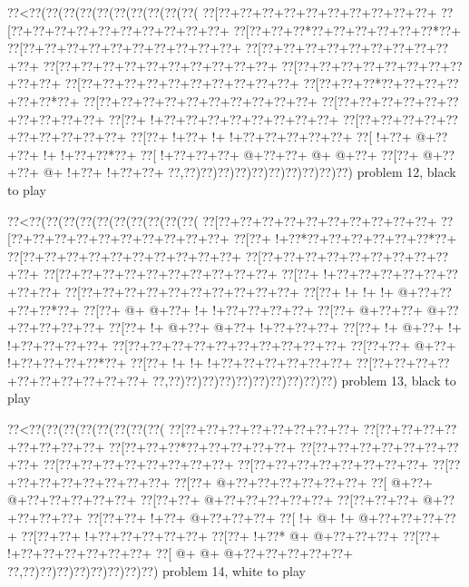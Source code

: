 \vbox{\vbox{\goo
\0??<\0??(\0??(\0??(\0??(\0??(\0??(\0??(\0??(\0??(\0??(
\0??[\0??+\0??+\0??+\0??+\0??+\0??+\0??+\0??+\0??+\0??+
\0??[\0??+\0??+\0??+\0??+\0??+\0??+\0??+\0??+\0??+\0??+
\0??[\0??+\0??+\0??*\0??+\0??+\0??+\0??+\0??+\0??*\0??+
\0??[\0??+\0??+\0??+\0??+\0??+\0??+\0??+\0??+\0??+\0??+
\0??[\0??+\0??+\0??+\0??+\0??+\0??+\0??+\0??+\0??+\0??+
\0??[\0??+\0??+\0??+\0??+\0??+\0??+\0??+\0??+\0??+\0??+
\0??[\0??+\0??+\0??+\0??+\0??+\0??+\0??+\0??+\0??+\0??+
\0??[\0??+\0??+\0??+\0??+\0??+\0??+\0??+\0??+\0??+\0??+
\0??[\0??+\0??+\0??*\0??+\0??+\0??+\0??+\0??+\0??*\0??+
\0??[\0??+\0??+\0??+\0??+\0??+\0??+\0??+\0??+\0??+\0??+
\0??[\0??+\0??+\0??+\0??+\0??+\0??+\0??+\0??+\0??+\0??+
\0??[\0??+\- !+\0??+\0??+\0??+\0??+\0??+\0??+\0??+\0??+
\0??[\0??+\0??+\0??+\0??+\0??+\0??+\0??+\0??+\0??+\0??+
\0??[\0??+\- !+\0??+\- !+\- !+\0??+\0??+\0??+\0??+\0??+
\0??[\- !+\0??+\- @+\0??+\0??+\- !+\- !+\0??+\0??*\0??+
\0??[\- !+\0??+\0??+\0??+\- @+\0??+\0??+\- @+\- @+\0??+
\0??[\0??+\- @+\0??+\0??+\- @+\- !+\0??+\- !+\0??+\0??+
\0??,\0??)\0??)\0??)\0??)\0??)\0??)\0??)\0??)\0??)\0??)
}
\hfil problem 12, black to play\hfil\break
}

\vbox{\vbox{\goo
\0??<\0??(\0??(\0??(\0??(\0??(\0??(\0??(\0??(\0??(\0??(
\0??[\0??+\0??+\0??+\0??+\0??+\0??+\0??+\0??+\0??+\0??+
\0??[\0??+\0??+\0??+\0??+\0??+\0??+\0??+\0??+\0??+\0??+
\0??[\0??+\- !+\0??*\0??+\0??+\0??+\0??+\0??+\0??*\0??+
\0??[\0??+\0??+\0??+\0??+\0??+\0??+\0??+\0??+\0??+\0??+
\0??[\0??+\0??+\0??+\0??+\0??+\0??+\0??+\0??+\0??+\0??+
\0??[\0??+\0??+\0??+\0??+\0??+\0??+\0??+\0??+\0??+\0??+
\0??[\0??+\- !+\0??+\0??+\0??+\0??+\0??+\0??+\0??+\0??+
\0??[\0??+\0??+\0??+\0??+\0??+\0??+\0??+\0??+\0??+\0??+
\0??[\0??+\- !+\- !+\- !+\- @+\0??+\0??+\0??+\0??*\0??+
\0??[\0??+\- @+\- @+\0??+\- !+\- !+\0??+\0??+\0??+\0??+
\0??[\0??+\- @+\0??+\0??+\- @+\0??+\0??+\0??+\0??+\0??+
\0??[\0??+\- !+\- @+\0??+\- @+\0??+\- !+\0??+\0??+\0??+
\0??[\0??+\- !+\- @+\0??+\- !+\- !+\0??+\0??+\0??+\0??+
\0??[\0??+\0??+\0??+\0??+\0??+\0??+\0??+\0??+\0??+\0??+
\0??[\0??+\0??+\- @+\0??+\- !+\0??+\0??+\0??+\0??*\0??+
\0??[\0??+\- !+\- !+\- !+\0??+\0??+\0??+\0??+\0??+\0??+
\0??[\0??+\0??+\0??+\0??+\0??+\0??+\0??+\0??+\0??+\0??+
\0??,\0??)\0??)\0??)\0??)\0??)\0??)\0??)\0??)\0??)\0??)
}
\hfil problem 13, black to play\hfil\break
}

\vbox{\vbox{\goo
\0??<\0??(\0??(\0??(\0??(\0??(\0??(\0??(\0??(
\0??[\0??+\0??+\0??+\0??+\0??+\0??+\0??+\0??+
\0??[\0??+\0??+\0??+\0??+\0??+\0??+\0??+\0??+
\0??[\0??+\0??+\0??*\0??+\0??+\0??+\0??+\0??+
\0??[\0??+\0??+\0??+\0??+\0??+\0??+\0??+\0??+
\0??[\0??+\0??+\0??+\0??+\0??+\0??+\0??+\0??+
\0??[\0??+\0??+\0??+\0??+\0??+\0??+\0??+\0??+
\0??[\0??+\0??+\0??+\0??+\0??+\0??+\0??+\0??+
\0??[\0??+\- @+\0??+\0??+\0??+\0??+\0??+\0??+
\0??[\- @+\0??+\- @+\0??+\0??+\0??+\0??+\0??+
\0??[\0??+\0??+\- @+\0??+\0??+\0??+\0??+\0??+
\0??[\0??+\0??+\0??+\- @+\0??+\0??+\0??+\0??+
\0??[\0??+\0??+\- !+\0??+\- @+\0??+\0??+\0??+
\0??[\- !+\- @+\- !+\- @+\0??+\0??+\0??+\0??+
\0??[\0??+\0??+\- !+\0??+\0??+\0??+\0??+\0??+
\0??[\0??+\- !+\0??*\- @+\- @+\0??+\0??+\0??+
\0??[\0??+\- !+\0??+\0??+\0??+\0??+\0??+\0??+
\0??[\- @+\- @+\- @+\0??+\0??+\0??+\0??+\0??+
\0??,\0??)\0??)\0??)\0??)\0??)\0??)\0??)\0??)
}
\hfil problem 14, white to play\hfil\break
}

